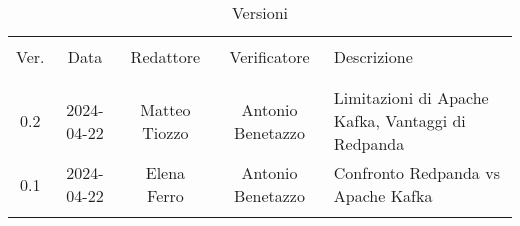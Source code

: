 \documentclass[italian,12pt]{article}
\begin{document}

\newpage


\begin{table}[!h]
	\caption*{Versioni}
	\begin{center}
		\begin{tabular}{ c c c c p{6.1cm} }
			\hline                                                                                                    \\[-2ex]
			Ver. & Data       & Redattore     & Verificatore      & Descrizione                                       \\
			\\[-2ex] \hline \\[-1.5ex]
			0.2  & 2024-04-22 & Matteo Tiozzo & Antonio Benetazzo & Limitazioni di Apache Kafka, Vantaggi di Redpanda \\
			0.1  & 2024-04-22 & Elena Ferro   & Antonio Benetazzo & Confronto Redpanda vs Apache Kafka                \\
			\\[-1.5ex] \hline
		\end{tabular}
	\end{center}
\end{table}

\newpage
\tableofcontents
\listoftables
\listoffigures
\newpage
















\end{document}
